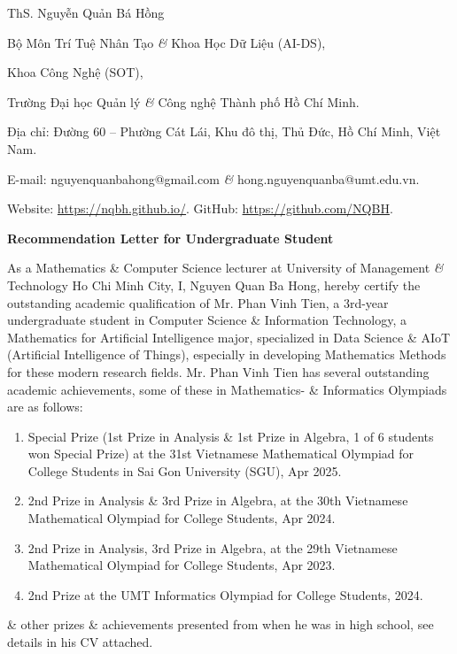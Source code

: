 \documentclass[11pt]{article}
\begin{document}
\begin{flushright}
    ThS. {\sc Nguyễn Quản Bá Hồng}
    
    Bộ Môn Trí Tuệ Nhân Tạo {\it\&} Khoa Học Dữ Liệu (AI-DS),
    
    Khoa Công Nghệ (SOT),
    
    Trường Đại học Quản lý {\it\&} Công nghệ Thành phố Hồ Chí Minh.
    
    Địa chỉ: Đường 60 -- Phường Cát Lái, Khu đô thị, Thủ Đức, Hồ Chí Minh, Việt Nam.
    
    E-mail: {\sf nguyenquanbahong@gmail.com} {\it\&} {\sf hong.nguyenquanba@umt.edu.vn}.
    
    Website: \url{https://nqbh.github.io/}. GitHub: \url{https://github.com/NQBH}.
\end{flushright}
\vspace{5mm}
\begin{center}
    \LARGE
    \textbf{\textsf{Recommendation Letter for Undergraduate Student}}
\end{center}
As a Mathematics \& Computer Science lecturer at University of Management {\it\&} Technology Ho Chi Minh City, I, {\sc Nguyen Quan Ba Hong}, hereby certify the outstanding academic qualification of Mr. {\sc Phan Vinh Tien}, a 3rd-year undergraduate student in Computer Science \& Information Technology, a Mathematics for Artificial Intelligence major, specialized in Data Science \& AIoT (Artificial Intelligence of Things), especially in developing Mathematics Methods for these modern research fields. Mr. {\sc Phan Vinh Tien} has several outstanding academic achievements, some of these in Mathematics- \& Informatics Olympiads are as follows:
\begin{enumerate}
    \item Special Prize (1st Prize in Analysis \& 1st Prize in Algebra, 1 of 6 students won Special Prize) at the 31st Vietnamese Mathematical Olympiad for College Students in Sai Gon University (SGU), Apr 2025.
    
    \item 2nd Prize in Analysis \& 3rd Prize in Algebra, at the 30th Vietnamese Mathematical Olympiad for College Students, Apr 2024.
    
    \item 2nd Prize in Analysis, 3rd Prize in Algebra, at the 29th Vietnamese Mathematical Olympiad for College Students, Apr 2023.
    
    \item 2nd Prize at the UMT Informatics Olympiad for College Students, 2024.
\end{enumerate}
\& other prizes \& achievements presented from when he was in high school, see details in his CV attached.
\end{document}

